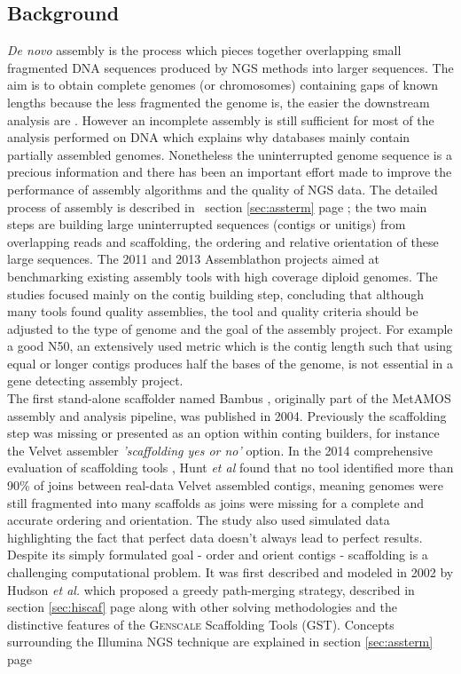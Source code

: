 \documentclass[12pt]{article}
\newcommand*{\fulleref}[1]{section \hyperref[{#1}] {\ref*{#1}} page {\pageref{#1}}}%
\begin{document}
\subsection{Background}
\textit{De novo} assembly is the process which pieces together overlapping small fragmented DNA sequences produced by NGS methods into larger sequences. The aim is to obtain complete genomes (or chromosomes) containing gaps of known lengths because the less fragmented the genome is, the easier the downstream analysis are \cite{hunt_comprehensive_2014}. However an incomplete assembly is still sufficient for most of the analysis performed on DNA which explains why databases mainly contain partially assembled genomes. Nonetheless the uninterrupted genome sequence is a precious information and there has been an important effort made to improve the performance of assembly algorithms and the quality of NGS data. The detailed process of assembly is described in ~\fulleref{sec:assterm}; the two main steps are building large uninterrupted sequences (contigs or unitigs) from overlapping reads and scaffolding, the ordering and relative orientation of these large sequences. The 2011 and 2013 Assemblathon projects \cite{earl_assemblathon_2011} \cite{bradnam_assemblathon_2013} aimed at  benchmarking existing assembly tools with high coverage diploid genomes. The studies focused mainly on the contig building step, concluding that although many tools found quality assemblies, the tool and quality criteria should be adjusted to the type of genome and the goal of the assembly project. For example a good N50, an extensively used metric which is the contig length such that using equal or longer contigs produces half the bases of the genome, is not essential in a gene detecting assembly project. \\
The first stand-alone scaffolder named Bambus \cite{pop_hierarchical_2004}, originally part of the MetAMOS \cite{treangen_metamos:_2013} assembly and analysis pipeline, was published in 2004. Previously the scaffolding step was missing or presented as an option within conting builders, for instance the Velvet\cite{zerbino_velvet:_2008} assembler \textit{'scaffolding yes or no'} option. In the 2014 comprehensive evaluation of scaffolding tools \cite{hunt_comprehensive_2014-1}, Hunt \textit{et al} found that no tool identified more than 90\% of joins between real-data Velvet assembled contigs, meaning genomes were still fragmented into many scaffolds as joins were missing for a complete and accurate ordering and orientation. The study also used simulated data highlighting the fact that perfect data doesn't always lead to perfect results. Despite its simply formulated goal - order and orient contigs - scaffolding is a challenging computational problem. It was first described and modeled in 2002 by Hudson \textit{et al.}\cite{huson_greedy_2002} which proposed a greedy path-merging strategy, described in \fulleref{sec:hiscaf} along with other solving methodologies and the distinctive features of the \textsc{Genscale} Scaffolding Tools (GST). Concepts surrounding the Illumina NGS technique are explained in \fulleref{sec:assterm}
\end{document}
